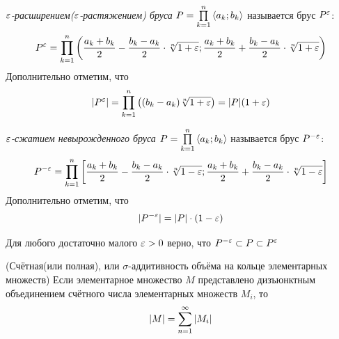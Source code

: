 \begin{definition}
	\textit{$\varepsilon$-расширением($\varepsilon$-растяжением) бруса} $P = \prod\limits_{k = 1}^n \left\langle a_k; b_k\right\rangle$ называется брус $P^\varepsilon$:
	\[
		P^\varepsilon = \prod\limits_{k = 1}^n \left(\frac{a_k + b_k}{2} - \frac{b_k - a_k}{2} \cdot \sqrt[n]{1 + \varepsilon}; \frac{a_k + b_k}{2} + \frac{b_k - a_k}{2} \cdot \sqrt[n]{1 + \varepsilon}\right)
	\]
	Дополнительно отметим, что
	\[
		|P^\varepsilon| = \prod\limits_{k = 1}^n \big((b_k - a_k)\sqrt[n]{1 + \varepsilon}\big) = |P|(1 + \varepsilon)
	\]
\end{definition}

\begin{definition}
	\textit{$\varepsilon$-сжатием невырожденного бруса} $P = \prod\limits_{k = 1}^n \left\langle a_k; b_k\right\rangle$ называется брус $P^{-\varepsilon}$:
	\[
		P^{-\varepsilon} = \prod\limits_{k = 1}^n \left[\frac{a_k + b_k}{2} - \frac{b_k - a_k}{2} \cdot \sqrt[n]{1 - \varepsilon}; \frac{a_k + b_k}{2} + \frac{b_k - a_k}{2} \cdot \sqrt[n]{1 - \varepsilon}\right]
	\]
	Дополнительно отметим, что
	\[
		|P^{-\varepsilon}| = |P| \cdot (1 - \varepsilon)
	\]
\end{definition}

\begin{note}
	Для любого достаточно малого $\varepsilon > 0$ верно, что $P^{-\varepsilon} \subset P \subset P^\varepsilon$
\end{note}

\begin{theorem} (Счётная(или полная), или $\sigma$-аддитивность объёма на кольце элементарных множеств)
	Если элементарное множество $M$ представлено дизъюнктным объединением счётного числа элементарных множеств $M_i$, то
	\[
		|M| = \sum_{n = 1}^\infty |M_i|
	\]
\end{theorem}

